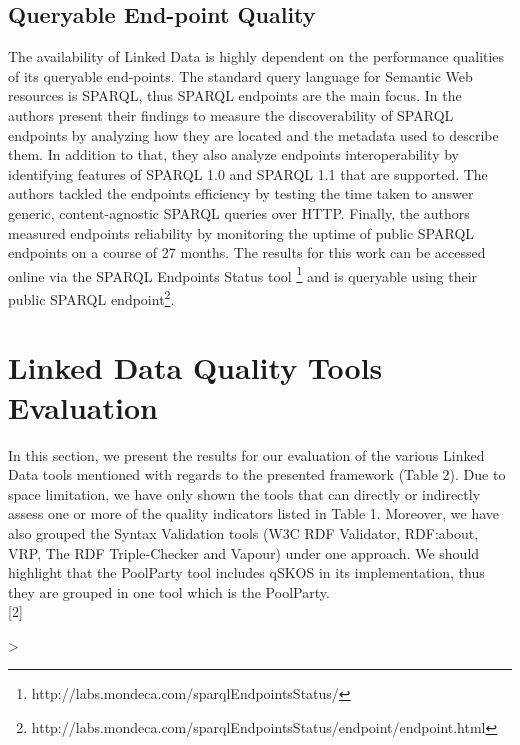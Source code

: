\documentclass[onecolumn, crcready]{iosart2c}
\begin{document}
\subsection{Queryable End-point Quality}
The availability of Linked Data is highly dependent on the performance qualities of its queryable end-points. The standard query language for Semantic Web resources is SPARQL, thus SPARQL endpoints are the main focus. In \cite{Buil-Aranda2013} the authors present their findings to measure the discoverability of SPARQL endpoints by analyzing how they are located and the metadata used to describe them. In addition to that, they also analyze endpoints interoperability by identifying features of SPARQL 1.0 and SPARQL 1.1 that are supported. The authors tackled the endpoints efficiency by testing the time taken to answer generic, content-agnostic SPARQL queries over HTTP. Finally, the authors measured endpoints reliability by monitoring the uptime of public SPARQL endpoints on a course of 27 months. The results for this work can be accessed online via the SPARQL Endpoints Status tool \footnote{http://labs.mondeca.com/sparqlEndpointsStatus/} and is queryable using their public SPARQL endpoint\footnote{http://labs.mondeca.com/sparqlEndpointsStatus/endpoint/endpoint.html}. \\

\section{Linked Data Quality Tools Evaluation}
In this section, we present the results for our evaluation of the various Linked Data tools mentioned with regards to the presented framework (Table 2). Due to space limitation, we have only shown the tools that can directly or indirectly assess one or more of the quality indicators listed in Table 1. Moreover, we have also grouped the Syntax Validation tools (W3C RDF Validator, RDF:about, VRP, The RDF Triple-Checker and Vapour) under one approach. We should highlight that the PoolParty tool includes qSKOS in its implementation, thus they are grouped in one tool which is the PoolParty.\\

\newcolumntype{P}[2]{%
  >{\begin{turn}{#1}\begin{minipage}{#2}\small\raggedright\hspace{0pt}}l%
  <{\end{minipage}\end{turn}}%
}
\end{document}
